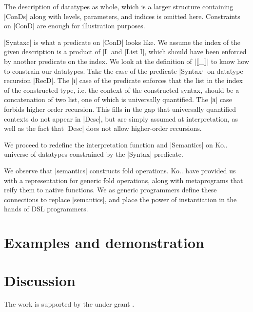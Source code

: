 \documentclass[sigplan,review,fleqn]{acmart}
\renewcommand{\verb}{\collectverb{\color{AgdaFunction}}}
\newcommand{\con}{\collectverb{\color{AgdaInductiveConstructor}}}
\begin{document}
The description of datatypes as whole, which is a larger structure containing \verb|ConDs| along with levels, parameters, and indices is omitted here.
Constraints on \verb|ConD| are enough for illustration purposes.

\verb|Syntaxc| is what a predicate on \verb|ConD| looks like.
We assume the index of the given description is a product of \verb|I| and \verb|List I|, which should have been enforced by another predicate on the index.
We look at the definition of \verb|⟦_⟧| to know how to constrain our datatypes.
Take the case of the predicate \verb|Syntaxʳ| on datatype recursion \verb|RecD|.
The \con|ι| case of the predicate enforces that the list in the index of the constructed type, i.e. the context of the constructed syntax, should be a concatenation of two list, one of which is universally quantified.
The \con|π| case forbids higher order recursion.
This fills in the gap that universally quantified contexts do not appear in \verb|Desc|, but are simply assumed at interpretation, as well as the fact that \verb|Desc| does not allow higher-order recursions.

We proceed to redefine the interpretation function and \verb|Semantics| on Ko.. universe of datatypes constrained by the \verb|Syntax| predicate.

We observe that \verb|semantics| constructs fold operations.
Ko.. have provided us with a representation for generic fold operations, along with metaprograms that reify them to native functions.
We as generic programmers define these connections to replace \verb|semantics|, and place the power of instantiation in the hands of DSL programmers.


\section{Examples and demonstration}

\section{Discussion}
\begin{acks}
The work is supported by the  under grant .
\end{acks}
\end{document}
